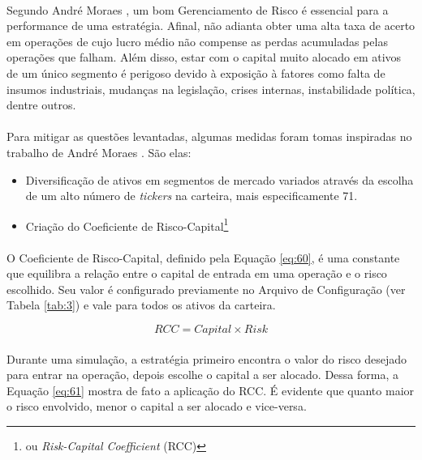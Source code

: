 \paragraph{} Segundo André Moraes \cite{moraes2007se}, um bom Gerenciamento de Risco é essencial para a performance de uma estratégia. Afinal, não adianta obter uma alta taxa de acerto em operações de cujo lucro médio não compense as perdas acumuladas pelas operações que falham. Além disso, estar com o capital muito alocado em ativos de um único segmento é perigoso devido à exposição à fatores como falta de insumos industriais, mudanças na legislação, crises internas, instabilidade política, dentre outros.

\paragraph{} Para mitigar as questões levantadas, algumas medidas foram tomas inspiradas no trabalho de André Moraes \cite{moraes2007se}. São elas:

\begin{itemize}
    \item Diversificação de ativos em segmentos de mercado variados através da escolha de um alto número de \textit{tickers} na carteira, mais especificamente 71.
    \item Criação do Coeficiente de Risco-Capital\footnote{ou \textit{Risk-Capital Coefficient} (RCC)}
\end{itemize}

\paragraph{} O Coeficiente de Risco-Capital, definido pela Equação \ref{eq:60}, é uma constante que equilibra a relação entre o capital de entrada em uma operação e o risco escolhido. Seu valor é configurado previamente no Arquivo de Configuração (ver Tabela \ref{tab:3}) e vale para todos os ativos da carteira.

\begin{equation} \label{eq:60}
    RCC = Capital \times Risk
\end{equation}

\paragraph{} Durante uma simulação, a estratégia primeiro encontra o valor do risco desejado para entrar na operação, depois escolhe o capital a ser alocado. Dessa forma, a Equação \ref{eq:61} mostra de fato a aplicação do RCC. É evidente que quanto maior o risco envolvido, menor o capital a ser alocado e vice-versa.

